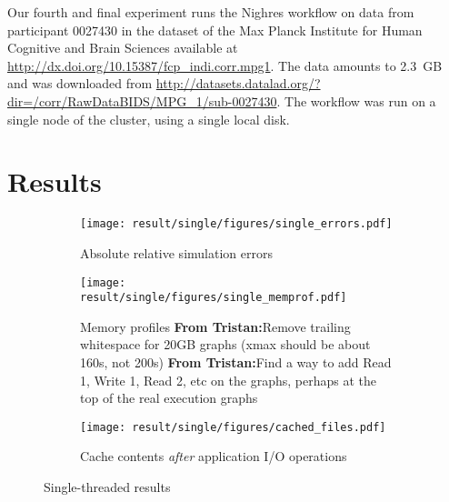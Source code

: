 \documentclass[conference]{IEEEtran}
\newcommand{\tristan}[1]{\color{orange}\textbf{From Tristan:}#1\color{black}}
\begin{document}
            Our fourth and final experiment runs the Nighres workflow on
            data from participant 0027430 in the dataset of the Max Planck Institute for
            Human Cognitive and Brain Sciences
            available at
            \url{http://dx.doi.org/10.15387/fcp_indi.corr.mpg1}. The data
            amounts to 2.3~GB and was downloaded from
            \url{http://datasets.datalad.org/?dir=/corr/RawDataBIDS/MPG_1/sub-0027430}.
            The workflow was run on a single node of the cluster, using a
            single local disk.

    \section{Results}
    \label{results}

    \begin{figure*}
        \centering
        \begin{subfigure}{\linewidth}
            \centering
               \texttt{[image: result/single/figures/single\_errors.pdf]}
               \vspace*{-0.7cm}
               \caption{Absolute relative simulation errors}
               \vspace*{0.5cm}
               \label{fig:single_error}
            \end{subfigure}
        \begin{subfigure}{\linewidth}
            \centering
               \texttt{[image: result/single/figures/single\_memprof.pdf]}
               \vspace*{-0.7cm}
               \caption{Memory profiles \tristan{Remove trailing
               whitespace for 20GB graphs (xmax should be about 160s,
               not 200s)} \tristan{Find a way to add Read 1, Write 1,
               Read 2, etc on the graphs, perhaps at the top of the
               real execution graphs}}
               \vspace*{0.5cm}
               \label{fig:single_memprof}
        \end{subfigure}
        \begin{subfigure}{\linewidth}
            \centering
               \texttt{[image: result/single/figures/cached\_files.pdf]}
               \caption{Cache contents \emph{after} application I/O operations}
               \label{fig:single_cache}
        \end{subfigure}
        \caption{Single-threaded results}
        \end{figure*}
\end{document}
